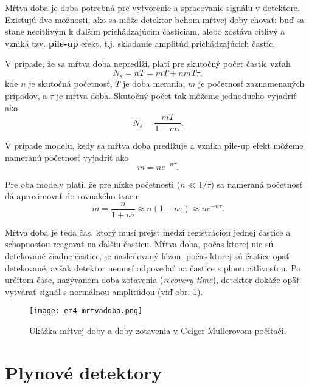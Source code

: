 \documentclass[../../main.tex]{subfiles}
\begin{document}
Mŕtva doba je doba potrebná pre vytvorenie a spracovanie signálu v detektore. Existujú dve možnosti, ako sa môže detektor behom mŕtvej doby chovať: buď sa stane necitlivým k ďalším prichádzajúcim časticiam, alebo zostáva citlivý a vzniká tzv. \textbf{pile-up} efekt, t.j. skladanie amplitúd prichádzajúcich častíc.

V prípade, že sa mŕtva doba nepredĺži, platí pre skutočný počet častíc vzťah
\begin{equation}
N_s=nT=mT+nmT\tau,
\end{equation}
kde $n$ je skutočná početnosť, $T$ je doba merania, $m$ je početnosť zaznamenaných prípadov, a $\tau$ je mŕtva doba. Skutočný počet tak môžeme jednoducho vyjadriť ako
\begin{equation}
N_s=\dfrac{mT}{1-m\tau}.
\end{equation}

V prípade modelu, kedy sa mŕtva doba predlžuje a vznika pile-up efekt môžeme nameranú početnosť vyjadriť ako
\begin{equation}
m=ne^{-n\tau}.
\end{equation}

Pre oba modely platí, že pre nízke početnosti ($n\ll 1/\tau$) sa nameraná početnosť dá aproximovať do rovnakého tvaru:
\begin{equation}
m=\dfrac{n}{1+n\tau}\approx n(1-n\tau) \approx	ne^{-n\tau}.
\end{equation}

Mŕtva doba je teda čas, ktorý musí prejsť medzi registráciou jednej častice a schopnosťou reagovať na ďalšiu časticu. Mŕtva doba, počas ktorej nie sú detekované žiadne častice, je nasledovaný fázou, počas ktorej sú častice opäť detekované, avšak detektor nemusí odpovedať na častice s plnou citlivosťou. Po určitom čase, nazývanom doba zotavenia (\textit{recovery time}), detektor dokáže opäť vytvárať signál s normálnou amplitúdou (viď obr. \ref{em4:img:mrtvadoba}).

\begin{figure}[h]
\centering
\texttt{[image: em4-mrtvadoba.png]}
\caption{Ukážka mŕtvej doby a doby zotavenia v Geiger-Mullerovom počítači.}
\label{em4:img:mrtvadoba}
\end{figure}

\section{Plynové detektory}
\end{document}
